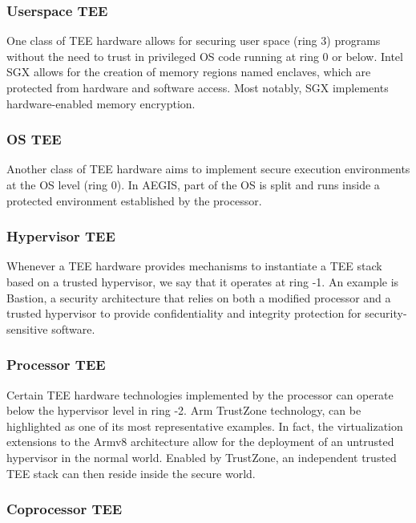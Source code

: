 \documentclass{article}
\begin{document}
\subsubsection{Userspace TEE}

One class of TEE hardware allows for securing user space (ring 3) programs without the need to trust in privileged OS code running at ring 0 or below. Intel SGX allows for the creation of memory regions named enclaves, which are protected from hardware and software access. Most notably, SGX implements hardware-enabled memory encryption. 

\subsubsection{OS TEE}

Another class of TEE hardware aims to implement secure execution environments at the OS level (ring 0). In AEGIS, part of the OS is split and runs inside a protected environment established by the processor.

\subsubsection{Hypervisor TEE}

Whenever a TEE hardware provides mechanisms to instantiate a TEE stack based on a trusted hypervisor, we say that it operates at ring -1. An example is Bastion, a security architecture that relies on both a modified processor and a trusted hypervisor to provide confidentiality and integrity protection for security-sensitive software.

\subsubsection{Processor TEE}

Certain TEE hardware technologies implemented by the processor can operate below the hypervisor level in ring -2. Arm TrustZone technology, can be highlighted as one of its most representative examples. In fact, the virtualization extensions to the Armv8 architecture allow for the deployment of an untrusted hypervisor in the normal world. Enabled by TrustZone, an independent trusted TEE stack can then reside inside the secure world.

\subsubsection{Coprocessor TEE}
\end{document}
